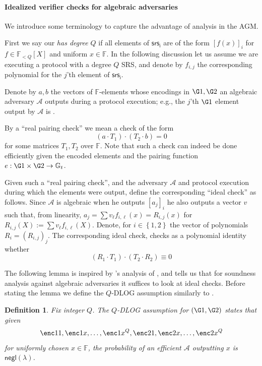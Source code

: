 \documentclass[11pt]{article} %
\newcommand{\Gt}{\ensuremath{{\mathbb G}_t}\xspace}
\newcommand{\F}{\ensuremath{\mathbb F}\xspace}
\newcommand{\adv}{\ensuremath{\mathcal A}\xspace}
\newcommand{\srsi}{\ensuremath{\mathsf{srs_i}}\xspace}
\newcommand{\negl}{\ensuremath{\mathsf{negl}(\lambda)}\xspace}
\newcommand{\defeq}{:=}
\newcommand{\enci}[1]{\ensuremath{\left[#1\right]_i}\xspace}
\newcommand{\set}[1]{\ensuremath{\left\{#1\right\}}\xspace}
\newcommand{\polysofdeg}[1]{\ensuremath{\F_{< #1}[X]}\xspace}
\newtheorem{dfn}[lemma]{Definition}
\begin{document}
\paragraph{Idealized verifier checks for algebraic adversaries}
We introduce some terminology to capture the advantage of analysis in the AGM.

First we say our  \emph{has degree $Q$} if all elements of \srsi are of the form  \enci{f(x)} for $f\in \polysofdeg{Q}$ and uniform $x\in \F$. In the following discussion let us assume we are executing a protocol with a degree $Q$ SRS, and denote by $f_{i,j}$ the corresponding polynomial for the $j$'th element of \srsi.

Denote by $a,b$ the vectors of $\F$-elements whose encodings in $\G1,\G2$ an algebraic adversary \adv outputs during a protocol execution; e.g., the $j$'th $\G1$ element output by \adv is .

By a ``real pairing check'' we mean a check of the form
\[(a\cdot T_1) \cdot (T_2\cdot b)=0\]
for some matrices $T_1,T_2$ over $\F$.
Note that such a check can indeed be done efficiently given the encoded elements and the pairing function $e:\G1\times \G2\to \Gt$.



Given such a ``real pairing check'', and the adversary \adv and protocol execution during which the elements were output, define the corresponding ``ideal check'' as follows.
Since \adv is algebraic when he outputs \enci{a_j} he also outputs a vector $v$ such that, from linearity, $a_j = \sum v_\ell f_{i,\ell}(x)=R_{i,j}(x)$ for $R_{i,j}(X) \defeq \sum v_\ell f_{i,\ell}(X)$.
Denote, for $i\in \set{1,2}$ the vector of polynomials $R_i=(R_{i,j})_j$.
The corresponding ideal check, checks as a polynomial identity whether
\[(R_1 \cdot T_1)\cdot (T_2\cdot R_2) \equiv 0\]


The following lemma is inspired by \cite{AGM}'s analysis of \cite{Groth16},
and tells us that for soundness analysis against algebraic adversaries it suffices to look at ideal checks.
Before stating the lemma we define the $Q$-DLOG assumption similarly to \cite{AGM}.
\begin{dfn}\label{ref:qdlog}
 Fix integer $Q$. The \emph{$Q$-DLOG assumption for $(\G1,\G2)$} states that given 
 \[\enc1{1},\enc1{x},\ldots,\enc1{x^Q},\enc2{1},\enc2{x},\ldots,\enc2{x^Q}\]
 for uniformly chosen $x\in \F$, the probability of an efficient \adv outputting $x$
 is \negl.
\end{dfn}
\end{document}
